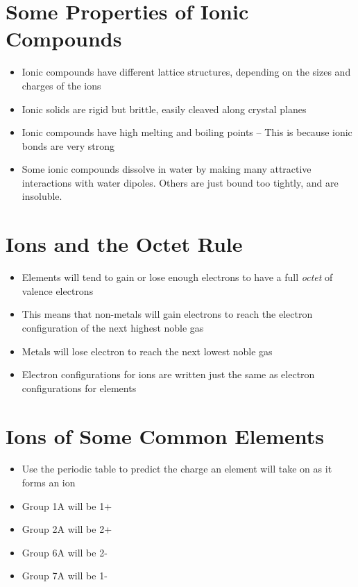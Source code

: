 \documentclass[12pt, openany, letterpaper]{memoir}
\begin{document}
\section{Some Properties of Ionic Compounds}
\begin{itemize}
	\item Ionic compounds have different lattice structures, depending on the sizes and charges of the ions
	\item Ionic solids are rigid but brittle, easily cleaved along crystal planes
	\item Ionic compounds have high melting and boiling points -- This is because ionic bonds are very strong
	\item Some ionic compounds dissolve in water by making many attractive interactions with water dipoles. Others are just bound too tightly, and are insoluble.
\end{itemize}
\section{Ions and the Octet Rule}
\begin{itemize}
	\item Elements will tend to gain or lose enough electrons to have a full \emph{octet} of valence electrons
	\item This means that non-metals will gain electrons to reach the electron configuration of the next highest noble gas
	\item Metals will lose electron to reach the next lowest noble gas
	\item Electron configurations for ions are written just the same as electron configurations for elements
\end{itemize}

\section{Ions of Some Common Elements}
\begin{itemize}
	\item Use the periodic table to predict the charge an element will take on as it forms an ion
	\item Group 1A will be 1+
	\item Group 2A will be 2+
	\item Group 6A will be 2-
	\item Group 7A will be 1-
\end{itemize}
\end{document}
